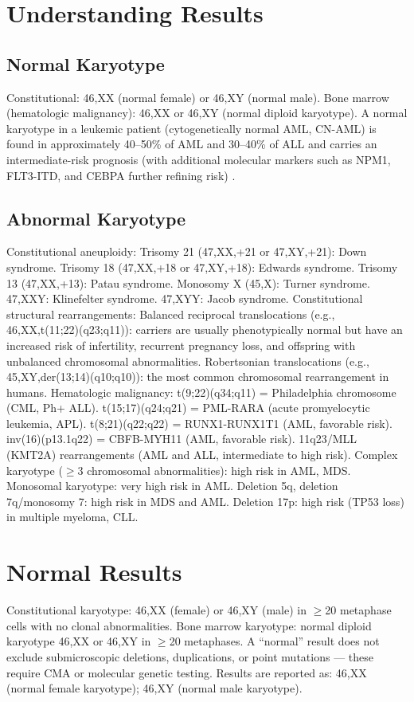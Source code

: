 \section*{Understanding Results}

\subsection*{Normal Karyotype}
Constitutional: 46,XX (normal female) or 46,XY (normal male). Bone marrow (hematologic malignancy): 46,XX or 46,XY (normal diploid karyotype). A normal karyotype in a leukemic patient (cytogenetically normal AML, CN-AML) is found in approximately 40--50\% of AML and 30--40\% of ALL and carries an intermediate-risk prognosis (with additional molecular markers such as NPM1, FLT3-ITD, and CEBPA further refining risk) \cite{dohner2017diagnosis}.

\subsection*{Abnormal Karyotype}
Constitutional aneuploidy: Trisomy 21 (47,XX,+21 or 47,XY,+21): Down syndrome. Trisomy 18 (47,XX,+18 or 47,XY,+18): Edwards syndrome. Trisomy 13 (47,XX,+13): Patau syndrome. Monosomy X (45,X): Turner syndrome. 47,XXY: Klinefelter syndrome. 47,XYY: Jacob syndrome. Constitutional structural rearrangements: Balanced reciprocal translocations (e.g., 46,XX,t(11;22)(q23;q11)): carriers are usually phenotypically normal but have an increased risk of infertility, recurrent pregnancy loss, and offspring with unbalanced chromosomal abnormalities. Robertsonian translocations (e.g., 45,XY,der(13;14)(q10;q10)): the most common chromosomal rearrangement in humans. Hematologic malignancy: t(9;22)(q34;q11) = Philadelphia chromosome (CML, Ph+ ALL). t(15;17)(q24;q21) = PML-RARA (acute promyelocytic leukemia, APL). t(8;21)(q22;q22) = RUNX1-RUNX1T1 (AML, favorable risk). inv(16)(p13.1q22) = CBFB-MYH11 (AML, favorable risk). 11q23/MLL (KMT2A) rearrangements (AML and ALL, intermediate to high risk). Complex karyotype ($\geq$3 chromosomal abnormalities): high risk in AML, MDS. Monosomal karyotype: very high risk in AML. Deletion 5q, deletion 7q/monosomy 7: high risk in MDS and AML. Deletion 17p: high risk (TP53 loss) in multiple myeloma, CLL.

\section*{Normal Results}
Constitutional karyotype: 46,XX (female) or 46,XY (male) in $\geq$20 metaphase cells with no clonal abnormalities. Bone marrow karyotype: normal diploid karyotype 46,XX or 46,XY in $\geq$20 metaphases. A ``normal'' result does not exclude submicroscopic deletions, duplications, or point mutations --- these require CMA or molecular genetic testing. Results are reported as: 46,XX (normal female karyotype); 46,XY (normal male karyotype).

